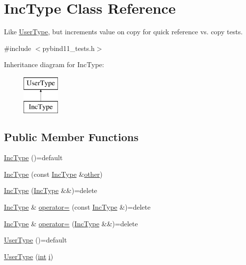 \hypertarget{class_inc_type}{}\section{Inc\+Type Class Reference}
\label{class_inc_type}


Like \mbox{\hyperlink{class_user_type}{User\+Type}}, but increments {\ttfamily value} on copy for quick reference vs. copy tests.  




{\ttfamily \#include $<$pybind11\+\_\+tests.\+h$>$}

Inheritance diagram for Inc\+Type\+:\begin{figure}[H]
\begin{center}
\leavevmode
\includegraphics[height=2.000000cm]{class_inc_type}
\end{center}
\end{figure}
\subsection*{Public Member Functions}
\begin{DoxyCompactItemize}
\item 
\mbox{\hyperlink{class_inc_type_aa93ab14b8909ae8963ae2e6dc2cc4bd2}{Inc\+Type}} ()=default
\item 
\mbox{\hyperlink{class_inc_type_a1b4408a83f7eecd3d558b3b4b840d20b}{Inc\+Type}} (const \mbox{\hyperlink{class_inc_type}{Inc\+Type}} \&\mbox{\hyperlink{dictobject_8h_abd4733e17e86acb453bda62bc8b96adf}{other}})
\item 
\mbox{\hyperlink{class_inc_type_afbbcb56ad21de4be1dcd0be20323edb4}{Inc\+Type}} (\mbox{\hyperlink{class_inc_type}{Inc\+Type}} \&\&)=delete
\item 
\mbox{\hyperlink{class_inc_type}{Inc\+Type}} \& \mbox{\hyperlink{class_inc_type_ac076f3da73c92b406e8c25a07b19b704}{operator=}} (const \mbox{\hyperlink{class_inc_type}{Inc\+Type}} \&)=delete
\item 
\mbox{\hyperlink{class_inc_type}{Inc\+Type}} \& \mbox{\hyperlink{class_inc_type_a565fdcfcc4d3314d59987dd6249c5ef3}{operator=}} (\mbox{\hyperlink{class_inc_type}{Inc\+Type}} \&\&)=delete
\item 
\mbox{\hyperlink{class_inc_type_a07d95c5b9030ed58983e95b53d3cfbc1}{User\+Type}} ()=default
\item 
\mbox{\hyperlink{class_inc_type_aa61d8a4462ac6fe39a0cfc85ee93b19a}{User\+Type}} (\mbox{\hyperlink{warnings_8h_a74f207b5aa4ba51c3a2ad59b219a423b}{int}} \mbox{\hyperlink{abstract_8h_a13235ab5ddf5c2ccd5ca35ab01d91328}{i}})
\end{DoxyCompactItemize}


